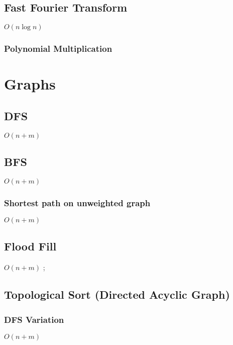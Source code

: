 \documentclass{article}
\begin{document}
\subsection{Fast Fourier Transform}
$O(n \log n)$

\subsubsection{Polynomial Multiplication}


\section{Graphs}
\subsection{DFS}
$O(n+m)$


\subsection{BFS}
$O(n+m)$


\subsubsection{Shortest path on unweighted graph}
$O(n+m)$


\subsection{Flood Fill}
$O(n+m)$
;

\subsection{Topological Sort (Directed Acyclic Graph)}
\subsubsection{DFS Variation}
$O(n+m)$

\end{document}

